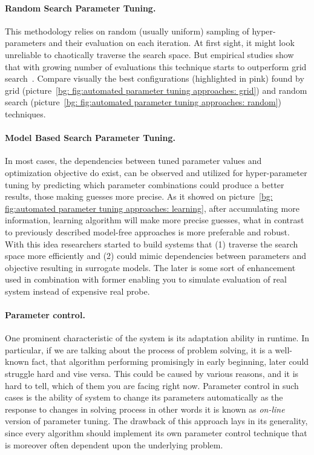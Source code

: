 \paragraph{Random Search Parameter Tuning.} This methodology relies on random (usually uniform) sampling of hyper-parameters and their evaluation on each iteration. At first sight, it might look unreliable to chaotically traverse the search space. But empirical studies show that with growing number of evaluations this technique starts to outperform grid search~\cite{bergstra2012random}. Compare visually the best configurations (highlighted in pink) found by grid (picture~\ref{bg: fig:automated parameter tuning approaches: grid}) and random search (picture~\ref{bg: fig:automated parameter tuning approaches: random}) techniques.

\paragraph{Model Based Search Parameter Tuning.} In most cases, the dependencies between tuned parameter values and optimization objective do exist, can be observed and utilized for hyper-parameter tuning by predicting which parameter combinations could produce a better results, those making guesses more precise. As it showed on picture~\ref{bg: fig:automated parameter tuning approaches: learning}, after accumulating more information, learning algorithm will make more precise guesses, what in contrast to previously described model-free approaches is more preferable and robust.
With this idea researchers started to build systems that (1) traverse the search space more efficiently and (2) could mimic dependencies between parameters and objective resulting in surrogate models. The later is some sort of enhancement used in combination with former enabling you to simulate evaluation of real system instead of expensive real probe.

\paragraph{Parameter control.} One prominent characteristic of the system is its adaptation ability in runtime. In particular, if we are talking about the process of problem solving, it is a well-known fact, that algorithm performing promisingly in early beginning, later could struggle hard and vise versa. This could be caused by various reasons, and it is hard to tell, which of them you are facing right now. Parameter control in such cases is the ability of system to change its parameters automatically as the response to changes in solving process in other words it is known as \textit{on-line} version of parameter tuning. The drawback of this approach lays in its generality, since every algorithm should implement its own parameter control technique that is moreover often dependent upon the underlying problem.


